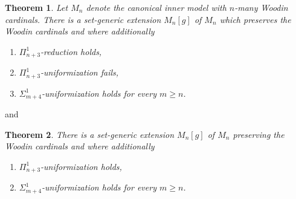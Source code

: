\documentclass[a4paper,11pt]{article}
\newtheorem{theorem}{Theorem}[section]
\begin{document}
\begin{theorem}
    Let $M_n$ denote the canonical inner model with $n$-many Woodin cardinals. There is a set-generic extension $M_n [g]$ of $M_n$ which preserves the Woodin cardinals and where additionally
    \begin{enumerate}
        \item $\Pi^1_{n+3}$-reduction holds,
        \item $\Pi^1_{n+3}$-uniformization fails,
        \item $\Sigma^1_{m+4}$-uniformization holds for every $m \ge n$.
    \end{enumerate}
\end{theorem}
and
\begin{theorem}
    There is a set-generic extension $M_n [g]$ of $M_n$ preserving the Woodin cardinals and where additionally
    \begin{enumerate}
        \item $\Pi^1_{n+3}$-uniformization holds,
        \item $\Sigma^1_{m+4}$-uniformization holds for every $m \ge n$.
    \end{enumerate}
\end{theorem}
\end{document}
